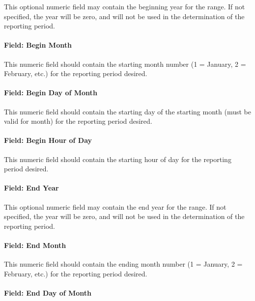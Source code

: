 This optional numeric field may contain the beginning year for the range. If not
specified, the year will be zero, and will not be used in the determination of the
reporting period.

\paragraph{Field: Begin Month}\label{field-begin-month-3}

This numeric field should contain the starting month number (1 = January, 2 =
February, etc.) for the reporting period desired.

\paragraph{Field: Begin Day of Month}\label{field-begin-day-of-month-3}

This numeric field should contain the starting day of the starting month (must
be valid for month) for the reporting period desired.

\paragraph{Field: Begin Hour of Day}\label{field-begin-hour-of-day}

This numeric field should contain the starting hour of day for the reporting
period desired.

\paragraph{Field: End Year}\label{field-end-year-2}

This optional numeric field may contain the end year for the range. If not
specified, the year will be zero, and will not be used in the determination of the
reporting period.

\paragraph{Field: End Month}\label{field-end-month-3}

This numeric field should contain the ending month number (1 = January, 2 =
February, etc.) for the reporting period desired.

\paragraph{Field: End Day of Month}\label{field-end-day-of-month-3}

